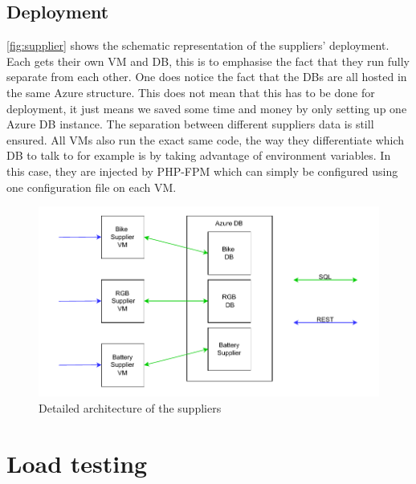 \documentclass[10pt,a4paper,kul]{kulakarticle} %
\begin{document}
		\subsection{Deployment}
			\autoref{fig:supplier} shows the schematic representation of the suppliers' deployment. Each gets their own VM and DB, this is to emphasise the fact that they run fully separate from each other. One does notice the fact that the DBs are all hosted in the same Azure structure. This does not mean that this has to be done for deployment, it just means we saved some time and money by only setting up one Azure DB instance. The separation between different suppliers data is still ensured. All VMs also run the exact same code, the way they differentiate which DB to talk to for example is by taking advantage of environment variables. In this case, they are injected by PHP-FPM which can simply be configured using one configuration file on each VM. 
			\begin{figure}[h!]
				\centering
				\includegraphics[width=0.7\linewidth]{images/supplier}
				\caption{Detailed architecture of the suppliers}
				\label{fig:supplier}
			\end{figure}
		
	\section{Load testing}
\end{document}
